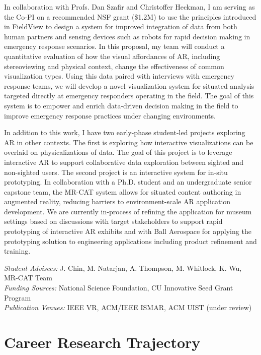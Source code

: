 \documentclass[11pt]{article}
\begin{document}
In collaboration with Profs. Dan Szafir and Christoffer Heckman, I am serving as the Co-PI on a recommended NSF grant (\$1.2M) to use the principles introduced in FieldView to design a system for improved integration of data from both human partners and sensing devices such as robots for rapid decision making in emergency response scenarios. In this proposal, my team will conduct a quantitative evaluation of how the visual affordances of AR, including stereoviewing and physical context, change the effectiveness of common visualization types. Using this data paired with interviews with emergency response teams, we will develop a novel visualization system for situated analysis targeted directly at emergency responders operating in the field. The goal of this system is to empower and enrich data-driven decision making in the field to improve emergency response practices under changing environments. 

In addition to this work, I have two early-phase student-led projects exploring AR in other contexts. The first is exploring how interactive visualizations can be overlaid on physicalizations of data. The goal of this project is to leverage interactive AR to support collaborative data exploration between sighted and non-sighted users. The second project is an interactive system for in-situ prototyping. In collaboration with a Ph.D. student and an undergraduate senior capstone team, the MR-CAT system allows for situated content authoring in augmented reality, reducing barriers to environment-scale AR application development. We are currently in-process of refining the application for museum settings based on discussions with target stakeholders to support rapid prototyping of interactive AR exhibits and with Ball Aerospace for applying the prototyping solution to engineering applications including product refinement and training. 


\emph{Student Advisees:} J. Chin, M. Natarjan, A. Thompson, M. Whitlock, K. Wu, MR-CAT Team\\
\emph{Funding Sources:} National Science Foundation, CU Innovative Seed Grant Program\\
\emph{Publication Venues:} IEEE VR, ACM/IEEE ISMAR, ACM UIST (under review)

\section*{Career Research Trajectory}
\end{document}
